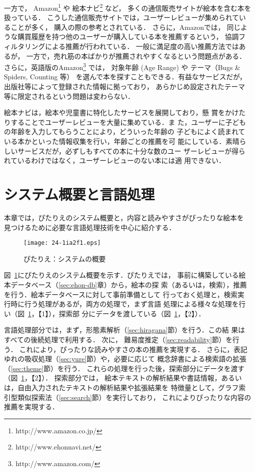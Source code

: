 \documentclass[japanese]{jnlp_1.4}
\newcommand{\changedB}[1]{}
\renewcommand{\changedB}[1]{}
\begin{document}
一方で， Amazon\footnote{http://www.amazon.co.jp/} や
絵本ナビ\footnote{http://www.ehonnavi.net/} など，
多くの通信販売サイトが絵本を含む本を扱っている．
こうした通信販売サイトでは，ユーザーレビューが集められていることが多く，
購入の際の参考とされている．
さらに，Amazonでは，
同じような購買履歴を持つ他のユーザーが購入している本を推薦するという，
協調フィルタリングによる推薦が行われている．
一般に満足度の高い推薦方法ではあるが，
一方で，売れ筋の本ばかりが推薦されやすくなるという問題点がある．
さらに，英語版のAmazon\footnote{http://www.amazon.com/} では，
対象年齢 (Age Range) や
テーマ（Bugs \& Spiders, Counting 等）
を選んで本を探すこともできる．有益なサービスだが，
出版社等によって登録された情報に拠っており，
あらかじめ設定されたテーマ等に限定されるという問題は変わらない．


絵本ナビは，絵本や児童書に特化したサービスを展開しており，懸
賞をかけたりすることでユーザーレビューを大量に集めている．ま
た，ユーザーに子どもの年齢を入力してもらうことにより，どういった年齢の
子どもによく読まれている本かといった情報収集を行い，年齢ごとの推薦を可
能にしている．素晴らしいサービスだが，必ずしもすべての本に十分な数のユー
ザーレビューが得られているわけではなく，ユーザーレビューのない本には適
用できない．


\section{システム概要と言語処理}\label{sec:system}


本章では，ぴたりえのシステム概要と，内容と読みやすさがぴったりな絵本を
見つけるために必要な言語処理技術を中心に紹介する．

\begin{figure}[b]
\begin{center}
\texttt{[image: 24-1ia2f1.eps]}
\end{center}
\caption{ぴたりえ：システムの概要}
\label{fig:pitarie-system}
\end{figure}

図~\ref{fig:pitarie-system}にぴたりえのシステム概要を示す．ぴたりえでは，
事前に構築している絵本データベース（\ref{sec:ehon-db}章）から，絵本の探
索（あるいは，検索），推薦を行う．絵本データベースに対して事前準備として
行っておく処理と，検索実行時に行う処理があるが，両方の処理で，まず言語
処理による様々な処理を行い（図~\ref{fig:pitarie-system}，【1】），探索部
分にデータを渡している（図~\ref{fig:pitarie-system}，【2】）．

言語処理部分では，まず，形態素解析（\ref{sec:hiragana}節）を行う．この結
果はすべての後続処理で利用する．
次に，
難易度推定（\ref{sec:readability}節）を行う．
これにより，\changedB{絵本を探している子どもにちょうど}ぴったりな読みやすさの本の推薦を実現する．
さらに，表記ゆれの吸収処理（\ref{sec:yure}節）や，必要に応じて
概念辞書による検索語の拡張（\ref{sec:theme}節）を行う．
これらの処理を行った後，探索部分にデータを渡す（図~\ref{fig:pitarie-system}，【2】）．
探索部分では，
絵本テキストの解析結果や書誌情報，あるいは，自由入力されたテキストの解析結果や拡張結果を
特徴量として，グラフ索引型類似探索法（\ref{sec:search}節）を実行しており，
これによりぴったりな内容の推薦を実現する．
\end{document}
